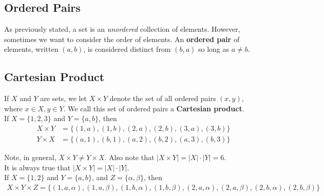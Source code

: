 \clearpage

\subsection*{Ordered Pairs}

As previously stated, a set is an \textit{unordered} collection of elements.  However, sometimes we want to consider the order of elements.  An \textbf{ordered pair} of elements, written $(a, b)$, is considered distinct from $(b, a)$ so long as $a \neq b$.  

\subsection*{Cartesian Product}

If $X$ and $Y$ are sets, we let $X \times Y$ denote the set of all ordered pairs $(x, y)$, where $x \in X, y \in Y$.  We call this set of ordered pairs a \textbf{Cartesian product}.\\

If $X = \{1, 2, 3\}$ and $Y = \{a, b\}$, then
\begin{align*}
X \times Y &= \{(1, a), (1, b), (2, a), (2, b), (3, a), (3, b)\}\\
Y \times X &= \{(a, 1), (b, 1), (a, 2), (b, 2), (a, 3), (b, 3)\}
\end{align*}

Note, in general, $X \times Y \neq Y \times X$.  Also note that $|X \times Y| = |X| \cdot |Y| = 6$.\\
It is always true that $|X \times Y| = |X| \cdot |Y|$.\\

If $X = \{1, 2\}$ and $Y = \{a, b\}$, and $Z = \{\alpha, \beta\}$, then
\begin{align*}
    X \times Y \times Z = \{(1, a, \alpha), (1, a, \beta), (1, b, \alpha), (1, b, \beta), (2, a, \alpha), (2, a, \beta), (2, b, \alpha), (2, b, \beta)\}
\end{align*}




